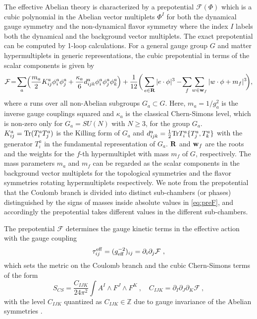 The effective Abelian theory is characterized by a prepotential $\mathcal{F}(\Phi)$ which is a cubic polynomial in the Abelian vector multiplets $\Phi^I$ for both the dynamical gauge symmetry and the non-dynamical flavor symmetry where the index $I$ labels both the dynamical and the background vector multiplets. The exact prepotential can be computed by 1-loop calculations. For a general gauge group $G$ and matter hypermultiplets in generic representations, the cubic prepotential in terms of the scalar components is given by \cite{Witten:1996qb, Intriligator:1997pq}
\begin{equation}\label{eq:preF}
	\mathcal{F} \!=\! \sum_a\!\Big(\frac{m_a}{2}K^a_{ij}\phi^a_i\phi^a_j + \frac{\kappa_a}{6}d^a_{ijk}\phi^a_i\phi^a_j\phi^a_k\Big) +\frac{1}{12}\bigg(\sum_{e\in{\bf R}}|e\cdot \phi|^3-\!\sum_f\!\sum_{w\in{\bf w}_f}|w\cdot\phi+m_f|^3\!\bigg),
\end{equation}
where $a$ runs over all non-Abelian subgroups $G_a\subset G$. Here, $m_a= 1/g_a^2$ is the inverse gauge couplings squared and $\kappa_a$ is the classical Chern-Simons level, which is non-zero only for $G_a=SU(N)$ with $N\ge3$, for the group $G_a$. $K^a_{ij}={\rm Tr} (T^a_iT^a_j)$ is the Killing form of $G_a$ and $d^a_{ijk}=\frac{1}{2}{\rm Tr}T^a_i\{T^a_j,T^a_k\}$ with the generator $T^a_i$ in the fundamental representation of $G_a$. ${\bf R}$ and ${\bf w}_f$ are the roots and the weights for the $f$-th hypermultiplet with mass $m_f$ of $G$, respectively. The mass parameters $m_a$ and $m_f$ can be regarded as the scalar components in the background vector multiplets for the topological symmetries and the flavor symmetries rotating hypermultiplets respectively. We note from the prepotential that the Coulomb branch is divided into distinct sub-chambers (or phases) distinguished by the signs of masses inside absolute values in \eqref{eq:preF}, and accordingly the prepotential takes different values in the different sub-chambers.

The prepotential $\mathcal{F}$ determines the gauge kinetic terms in the effective action with the gauge coupling 
\begin{equation}
	\tau_{ij}^{\rm eff} = (g^{-2}_{\rm eff})_{ij} = \partial_i \partial_j \mathcal{F} \ , 
\end{equation}
which sets the metric on the Coulomb branch and the cubic Chern-Simons terms of the form
\begin{equation}\label{eq:cubic-CS}
	S_{CS}=\frac{C_{IJK}}{24\pi^2}\int A^I\wedge F^J\wedge F^K \ , \quad C_{IJK} = \partial_I\partial_J\partial_K \mathcal{F} \ ,
\end{equation}
with the level $C_{IJK}$ quantized as $C_{IJK}\in \mathbb{Z}$ due to gauge invariance of the Abelian symmetries \cite{Witten:1996qb}.

